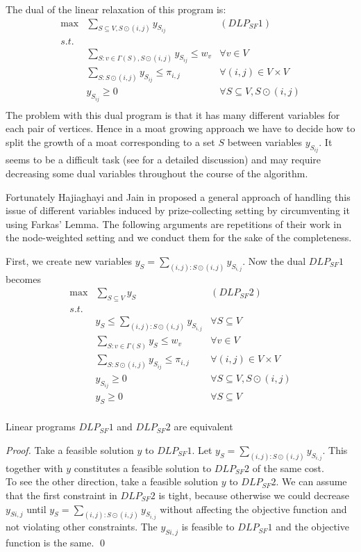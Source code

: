 The dual of the linear relaxation of this program is:
\begin{align*}
\text{max} & \sum_{S \subseteq V, S\odot (i,j)} y_{S_{ij}} & (DLP_{SF} 1)\\
s.t.\\
& \sum_{S:v\in\Gamma(S), S\odot(i,j)} y_{S_{ij}} \leq w_v	& \forall v \in V\\
& \sum_{S:S\odot(i,j)} y_{S_{ij}} \leq \pi_{i,j}			& \forall (i,j) \in V \times V\\
& y_{S_{ij}} \geq 0											& \forall S \subseteq V, S \odot (i,j)\\
\end{align*}
The problem with this dual program is that it has many different variables for each pair of vertices. Hence in a moat growing approach we have to decide how to split the growth of a moat corresponding to a set $S$ between variables $y_{S_{ij}}$. It seems to be a difficult task (see \cite{Hajiaghayi} for a detailed discussion) and may require decreasing some dual variables throughout the course of the algorithm.

Fortunately Hajiaghayi and Jain in \cite{Hajiaghayi} proposed a general approach of handling this issue of different variables induced by prize-collecting setting by circumventing it using Farkas' Lemma. The following arguments are repetitions of their work in the node-weighted setting and we conduct them for the sake of the completeness.

First, we create new variables $y_S = \sum_{(i,j): S\odot(i,j)} y_{S_{i,j}}$. Now the dual $DLP_{SF} 1$ becomes
\begin{align*}
\text{max} & \sum_{S \subseteq V} y_S & (DLP_{SF} 2)\\
s.t.\\
& y_S \leq \sum_{(i,j): S\odot(i,j)} y_{S_{i,j}}			& \forall S \subseteq V\\
& \sum_{S:v\in\Gamma(S)} y_S \leq w_v						& \forall v \in V\\
& \sum_{S:S\odot(i,j)} y_{S_{ij}} \leq \pi_{i,j}			& \forall (i,j) \in V \times V\\
& y_{S_{ij}} \geq 0											& \forall S \subseteq V, S \odot (i,j)\\
& y_S \geq 0												& \forall S \subseteq V\\
\end{align*}
\begin{fact}
Linear programs $DLP_{SF} 1$ and $DLP_{SF} 2$ are equivalent
\end{fact}
\begin{proof}
Take a feasible solution $y$ to $DLP_{SF} 1$. Let $y_S = \sum_{(i,j): S\odot(i,j)} y_{S_{i,j}}$. This together with $y$ constitutes a feasible solution to $DLP_{SF} 2$ of the same cost.\\
To see the other direction, take a feasible solution $y$ to $DLP_{SF} 2$. We can assume that the first constraint in $DLP_{SF} 2$ is tight, because otherwise we could decrease $y_{S{i,j}}$ until $y_S = \sum_{(i,j): S\odot(i,j)} y_{S_{i,j}}$ without affecting the objective function and not violating other constraints. The $y_{S{i,j}}$ is feasible to $DLP_{SF} 1$ and the objective function is the same. \qed
\end{proof}

